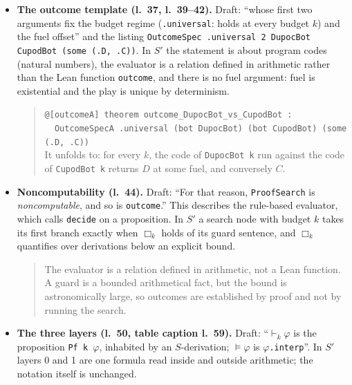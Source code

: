 \begin{itemize}
\begin{quote}
Finally, the statements the rest of the paper consumes follow two fixed, enforced templates, one for outcome theorems and one for floor dichotomies: a linter forces every tagged statement onto its template with a name matching its content, a census verifies the converse, and a coverage check verifies that every pair of programs in the paper's zoos is covered by one of the two.
\end{quote}
\item \textbf{The outcome template (l.~37, l.~39--42).} Draft: ``whose first two arguments fix the budget regime (\texttt{.universal}: holds at every budget $k$) and the fuel offset'' and the listing \texttt{OutcomeSpec .universal 2 DupocBot CupodBot (some (.D, .C))}. In $S'$ the statement is about program codes (natural numbers), the evaluator is a relation defined in arithmetic rather than the Lean function \texttt{outcome}, and there is no fuel argument: fuel is existential and the play is unique by determinism.
\begin{quote}
\texttt{@[outcomeA] theorem outcome\_DupocBot\_vs\_CupodBot :}\\
\texttt{\ \ OutcomeSpecA .universal (bot DupocBot) (bot CupodBot) (some (.D, .C))}\\
It unfolds to: for every $k$, the code of \texttt{DupocBot k} run against the code of \texttt{CupodBot k} returns $D$ at some fuel, and conversely $C$.
\end{quote}
\item \textbf{Noncomputability (l.~44).} Draft: ``For that reason, \texttt{ProofSearch} is \emph{noncomputable}, and so is \texttt{outcome}.'' This describes the rule-based evaluator, which calls \texttt{decide} on a proposition. In $S'$ a search node with budget $k$ takes its first branch exactly when $\Box_k$ holds of its guard sentence, and $\Box_k$ quantifies over derivations below an explicit bound.
\begin{quote}
The evaluator is a relation defined in arithmetic, not a Lean function. A guard is a bounded arithmetical fact, but the bound is astronomically large, so outcomes are established by proof and not by running the search.
\end{quote}
\item \textbf{The three layers (l.~50, table caption l.~59).} Draft: ``$\vdash_k\varphi$ is the proposition \texttt{Pf k $\varphi$}, inhabited by an $S$-derivation; $\models\varphi$ is \texttt{$\varphi$.interp}''. In $S'$ layers 0 and 1 are one formula read inside and outside arithmetic; the notation itself is unchanged.

\end{itemize}
